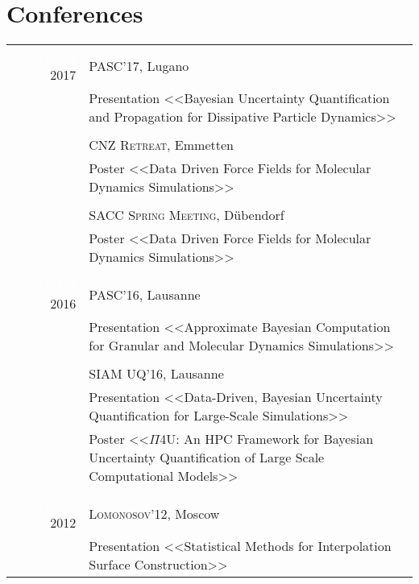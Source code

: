 \documentclass[a4paper,10pt]{article}
\begin{document}
\section{Conferences}
\begin{tabular}{r|p{13cm}}
    \textcolor{white}{11111111} 2017 & \textsc{PASC'17}, Lugano \\
    & \footnotesize{Presentation <<Bayesian Uncertainty Quantification and
    Propagation for Dissipative Particle Dynamics>>} \\
    & \\
    & \textsc{CNZ Retreat}, Emmetten \\
    & \footnotesize{Poster <<Data Driven Force Fields for Molecular Dynamics
    Simulations>>} \\
    & \\
    & \textsc{SACC Spring Meeting}, D\"ubendorf \\
    & \footnotesize{Poster <<Data Driven Force Fields for Molecular Dynamics
    Simulations>>} \\

    \multicolumn{2}{c}{} \\

    \textcolor{white}{11111111} 2016 & \textsc{PASC'16}, Lausanne \\
    & \footnotesize{Presentation <<Approximate Bayesian Computation for
    Granular and Molecular Dynamics Simulations>>} \\
    & \\
    & \textsc{SIAM UQ'16}, Lausanne \\
    & \footnotesize{Presentation <<Data-Driven, Bayesian Uncertainty
    Quantification for Large-Scale Simulations>>} \\
    & \footnotesize{Poster <<$\Pi$4U: An HPC Framework for Bayesian Uncertainty
    Quantification of Large Scale Computational Models>>} \\

    \multicolumn{2}{c}{} \\

    \textcolor{white}{11111111} 2012 & \textsc{Lomonosov'12}, Moscow \\
    & \footnotesize{Presentation <<Statistical Methods for Interpolation
    Surface Construction>>}
\end{tabular}
\end{document}

